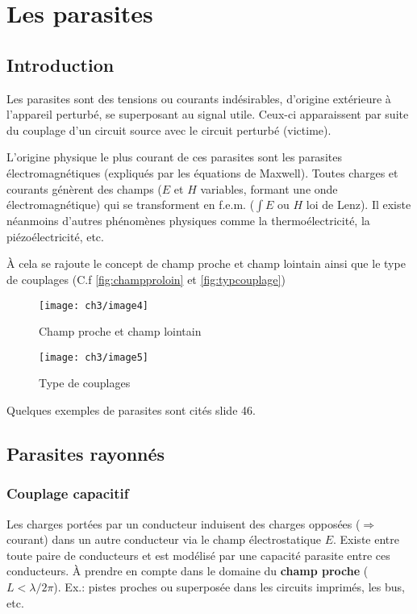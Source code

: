 \section{Les parasites}
\subsection{Introduction}
Les parasites sont des tensions ou courants indésirables, d'origine extérieure à l'appareil perturbé, se superposant au signal utile. Ceux-ci apparaissent par suite du couplage d'un circuit source avec le circuit perturbé (victime).\bigbreak

L'origine physique le plus courant de ces parasites sont les parasites électromagnétiques (expliqués par les équations de Maxwell). Toutes charges et courants génèrent des champs (\(E\) et \(H\) variables, formant une onde électromagnétique) qui se transforment en f.e.m. (\(\int E\) ou \(H\) loi de Lenz). Il existe néanmoins d'autres phénomènes physiques comme la thermoélectricité, la piézoélectricité, etc.\bigbreak

À cela se rajoute le concept de champ proche et champ lointain ainsi que le type de couplages (C.f \autoref{fig:champproloin} et \autoref{fig:typcouplage})
\begin{figure}[H] 
	\centering 
	\texttt{[image: ch3/image4]} 
	\caption{Champ proche et champ lointain} 
	\label{fig:champproloin}
\end{figure}
\begin{figure}[H] 
	\centering 
	\texttt{[image: ch3/image5]} 
	\caption{Type de couplages}
	\label{fig:typcouplage} 
\end{figure}
Quelques exemples de parasites sont cités slide 46.
\subsection{Parasites rayonnés}
\subsubsection{Couplage capacitif}
Les charges portées par un conducteur induisent des charges opposées (\(\Rightarrow\) courant) dans un autre conducteur via le champ électrostatique \(E\). Existe entre toute paire de conducteurs et est modélisé par une capacité parasite entre ces conducteurs. À prendre en compte dans le domaine du \textbf{champ proche} (\(L<\lambda/2\pi\)). Ex.: pistes proches ou superposée dans les circuits imprimés, les bus, etc.\bigbreak

